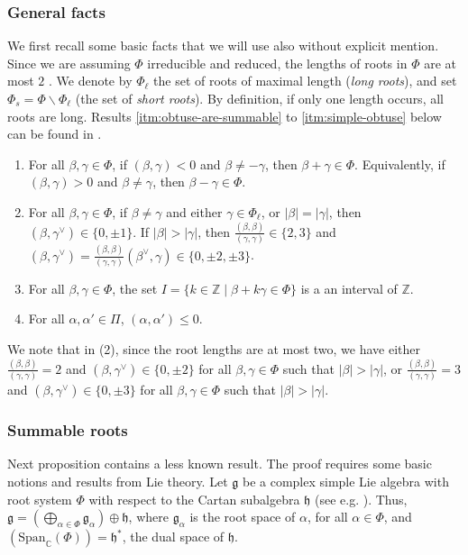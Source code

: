 \documentclass[10pt]{amsart}
\theoremstyle{definition}
\theoremstyle{remark}
\newcommand\mf{\mathfrak}
\newcommand\smeno{\smallsetminus}
\newcommand\ganz{\mathbb Z}
\newcommand\compl{\mathbb C}
\newcommand\gen{\mathrm{Span}}
\newcommand\al{\alpha}
\newcommand\be{\beta}
\newcommand\ga{\gamma}
\renewcommand{\leq}{\leqslant}
\begin{document}
\subsubsection{General facts}\label{sssec:general-roots}
We first recall some  basic facts that we will use also without explicit mention. 
Since we are assuming $\Phi$ irreducible and reduced, the lengths of roots in $\Phi$ are at most $2$ \cite[Ch.~VI, \S~1.4]{Bou}. 
We denote by $\Phi_\ell$ the set of roots of maximal length ({\it long roots}), and set $\Phi_s=\Phi\smeno\Phi_\ell$ (the set of {\it short roots}). 
By definition, if only one length occurs, all roots are long.
Results \ref{itm:obtuse-are-summable} to \ref{itm:simple-obtuse}
below can be found in  \cite[Ch.~VI, \S~1, n.~3, 4, 5]{Bou}.

\begin{enumerate}
\item
For all $\be, \ga\in \Phi$, if $(\be, \ga)<0$ and $\be\neq -\ga$, then $\be+\ga\in \Phi$. Equivalently, if $(\be, \ga)>0$ and $\be\neq \ga$, then $\be-\ga\in \Phi$.
\label{itm:obtuse-are-summable}
\item
For all $\be, \ga\in \Phi$, if $\be\neq \ga$ and  either $\ga\in \Phi_\ell$, or $|\be|=|\ga|$, then $(\be, \ga^\vee)\in \{0, \pm 1\}$. 
If $|\be|>|\ga|$, then $\frac{(\be, \be)}{(\ga, \ga)}\in \{2, 3\}$ and $(\be, \ga^\vee)=
\frac{(\be,\be)}{(\ga,\ga)}(\be^\vee, \ga)
\in \{0, \pm 2, \pm 3\}$. 
\label{itm:length-ratio}
\item
For all $\be, \ga\in \Phi$, the set $I=\{k\in \ganz\mid \be+k\ga\in \Phi\}$ is a an interval of $\ganz$. 
\label{itm:root-string}
\item
For all $\al, \al'\in \Pi$, $(\al, \al')\leq 0$.
\label{itm:simple-obtuse}
\end{enumerate}

We note that in (2), since the root lengths are at most two, we have either  $\frac{(\be,\be)}{(\ga,\ga)}=2$ and $(\be, \ga^\vee)\in \{0,\pm2\}$ for all $\be, \ga\in \Phi$ such that  $|\be|>|\ga|$, or $\frac{(\be,\be)}{(\ga,\ga)}=3$ and $(\be, \ga^\vee)\in \{0,\pm 3\}$ for all $\be, \ga\in \Phi$  such that $|\be|>|\ga|$.

\subsubsection{Summable roots}\label{sssec:summable-roots}
Next proposition contains a less known result.
The proof requires some basic notions and results from Lie theory.
Let $\mf g$ be  a complex simple Lie algebra with root system $\Phi$ with respect to the Cartan subalgebra $\mf h$ (see e.g. \cite[\S 18]{HuLie}). 
Thus, $\mf g=\left(\bigoplus_{\al\in\Phi}\mf g_\al\right)\oplus \mf h$, where $\mf g_\al$ is the root space of $\al$,  for all $\al\in \Phi$, and  $\left(\gen_\compl(\Phi)\right)=\mf h^*$, the dual space of $\mf h$. 
\end{document}
